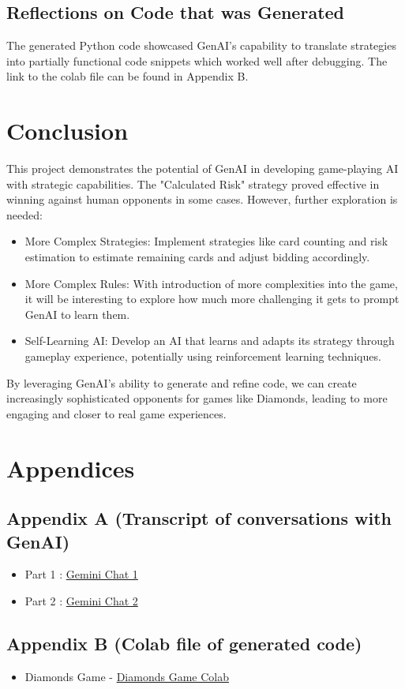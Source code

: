 \documentclass{article}
\begin{document}
\subsection{Reflections on Code that was Generated}

The generated Python code showcased GenAI's capability to translate strategies into partially functional code snippets which worked well after debugging. The link to the colab file can be found in Appendix B.

\section{Conclusion}

This project demonstrates the potential of GenAI in developing game-playing AI with strategic capabilities. The "Calculated Risk" strategy proved effective in winning against human opponents in some cases. However, further exploration is needed:
\begin{itemize}
    \item More Complex Strategies: Implement strategies like card counting and risk estimation to estimate remaining cards and adjust bidding accordingly.
    \item More Complex Rules: With introduction of more complexities into the game, it will be interesting to explore how much more challenging it gets to prompt GenAI to learn them.
    \item Self-Learning AI: Develop an AI that learns and adapts its strategy through gameplay experience, potentially using reinforcement learning techniques.
\end{itemize}
By leveraging GenAI's ability to generate and refine code, we can create increasingly sophisticated opponents for games like Diamonds, leading to more engaging and closer to real game experiences.



\section{Appendices}

\subsection{Appendix A (Transcript of conversations with GenAI)}
\begin{itemize}
    \item Part 1 :  \href{https://g.co/gemini/share/392039361a65}{Gemini Chat 1}
    \item Part 2 : \href{https://g.co/gemini/share/f798f20cf484}{Gemini Chat 2}
\end{itemize}

\subsection{Appendix B (Colab file of generated code)}
\begin{itemize}
    \item Diamonds Game - \href{https://colab.research.google.com/drive/1B7-SfQCkb1JJ_7puCBvB18ZG_3ihZmv4?usp=sharing}{Diamonds Game Colab}
\end{itemize}
\end{document}
